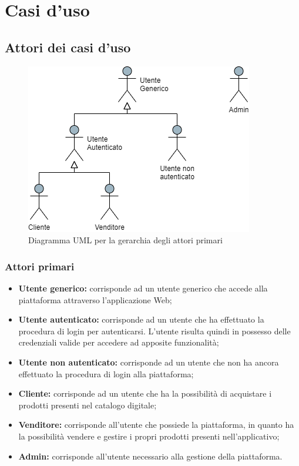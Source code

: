 \section{Casi d'uso}
\subsection{Attori dei casi d'uso}
\begin{figure}[H]
\centering
\includegraphics[scale=0.6]{res/UseCase/Immagini/DiagrammaAttoriPrimari}
\caption{Diagramma UML per la gerarchia degli attori primari}
\end{figure}
\subsubsection{Attori primari}
\begin{itemize}
\item \textbf{Utente generico:} corrisponde ad un utente generico che accede alla piattaforma attraverso l'applicazione Web;
\item \textbf{Utente autenticato:} corrisponde ad un utente che ha effettuato la procedura di login per autenticarsi. L'utente risulta quindi in possesso delle credenziali valide per accedere ad apposite funzionalità;
\item \textbf{Utente non autenticato:} corrisponde ad un utente che non ha ancora effettuato la procedura di login alla piattaforma;
\item \textbf{Cliente:} corrisponde ad un utente che ha la possibilità di acquistare i prodotti presenti nel catalogo digitale;
\item \textbf{Venditore:} corrisponde all'utente che possiede la piattaforma, in quanto ha la possibilità vendere e gestire i propri prodotti presenti nell'applicativo;
\item \textbf{Admin:} corrisponde all'utente necessario alla gestione della piattaforma.
\end{itemize}
